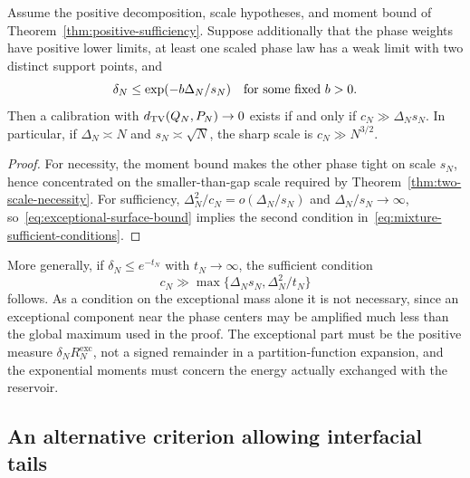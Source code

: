 \begin{corollary}
\label{cor:two-phase-iff}
Assume the positive decomposition, scale hypotheses, and moment bound
of Theorem~\ref{thm:positive-sufficiency}. Suppose additionally that
the phase weights have positive lower limits, at least one scaled
phase law has a weak limit with two distinct support points, and
\begin{equation}
 \delta_N\le\exp(-b\Delta_N/s_N)
 \quad\hbox{for some fixed }b>0.
 \label{eq:exceptional-surface-bound}
\end{equation}
Then a calibration with $d_{\mathrm{TV}}(Q_N,P_N)\to0$ exists if and only
if $c_N\gg\Delta_Ns_N$. In particular, if
$\Delta_N\asymp N$ and $s_N\asymp\sqrt N$, the sharp scale is
$c_N\gg N^{3/2}$.
\end{corollary}
\begin{proof}
For necessity, the moment bound makes the other phase tight on scale
$s_N$, hence concentrated on the smaller-than-gap scale required by
Theorem~\ref{thm:two-scale-necessity}. For sufficiency,
$\Delta_N^2/c_N=o(\Delta_N/s_N)$ and $\Delta_N/s_N\to\infty$,
so~\eqref{eq:exceptional-surface-bound} implies the second condition
in~\eqref{eq:mixture-sufficient-conditions}.
\end{proof}

More generally, if $\delta_N\le e^{-t_N}$ with $t_N\to\infty$,
the sufficient condition
\begin{equation}
 c_N\gg\max\{\Delta_Ns_N,\Delta_N^2/t_N\}
 \label{eq:exceptional-general-rate}
\end{equation}
follows. As a condition on the exceptional mass alone it is not
necessary, since an exceptional component near the phase centers may be amplified much less than the global
maximum used in the proof. The exceptional part must be the positive
measure $\delta_NR_N^{\mathrm{exc}}$, not a signed remainder in a
partition-function expansion, and the exponential moments must
concern the energy actually exchanged with the reservoir.

\subsection{An alternative criterion allowing interfacial tails}
\label{subsec:density-tails}

